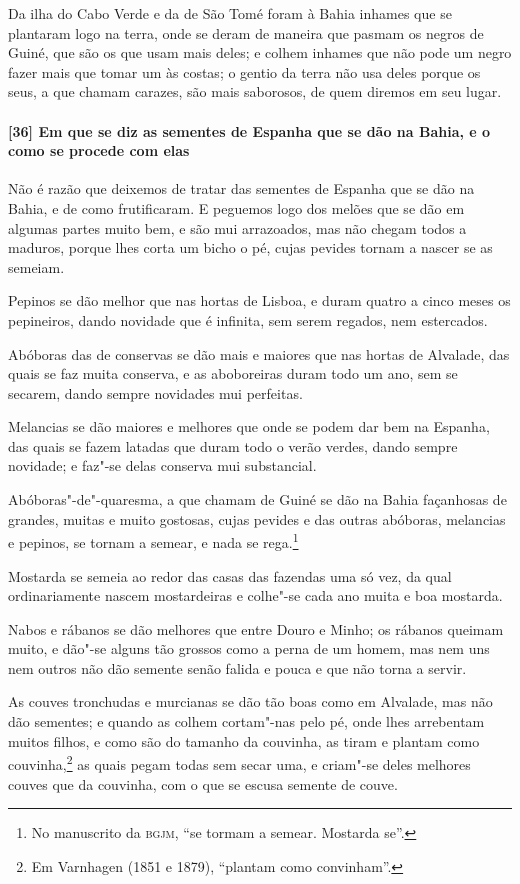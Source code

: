 \begin{linenumbers}
Da ilha do Cabo Verde e da de São Tomé foram à Bahia inhames que se plantaram logo na
terra, onde se deram de maneira que pasmam os negros de Guiné, que são os que usam mais
deles; e colhem inhames que não pode um negro fazer mais que tomar um às costas; o gentio
da terra não usa deles porque os seus, a que chamam carazes, são mais saborosos, de quem
diremos em seu lugar.

\paragraph{[36] Em que se diz as sementes de Espanha que se dão na Bahia, e o como se
procede com elas}\quad
Não é razão que deixemos de tratar das sementes de Espanha que se dão na Bahia, e de como
frutificaram. E peguemos logo dos melões que se dão em algumas partes muito bem, e são mui
arrazoados, mas não chegam todos a maduros, porque lhes corta um bicho o pé, cujas pevides
tornam a nascer se as semeiam.

Pepinos se dão melhor que nas hortas de Lisboa, e duram quatro a cinco meses os
pepineiros, dando novidade que é infinita, sem serem regados, nem estercados.

Abóboras das de conservas se dão mais e maiores que nas hortas de Alvalade, das quais se
faz muita conserva, e as aboboreiras duram todo um ano, sem se secarem, dando sempre
novidades mui perfeitas.

Melancias se dão maiores e melhores que onde se podem dar bem na Espanha, das quais se
fazem latadas que duram todo o verão verdes, dando sempre novidade; e faz"-se delas
conserva mui substancial.

Abóboras"-de"-quaresma, a que chamam de Guiné se dão na Bahia façanhosas de grandes, muitas
e muito gostosas, cujas pevides e das outras abóboras, melancias e pepinos, se tornam a
semear, e nada se rega.\footnote{ No manuscrito da \textsc{bgjm}, ``se tormam a semear.
Mostarda se''.}

Mostarda se semeia ao redor das casas das fazendas uma só vez, da qual ordinariamente
nascem mostardeiras e colhe"-se cada ano muita e boa mostarda.

Nabos e rábanos se dão melhores que entre Douro e Minho; os rábanos queimam muito, e
dão"-se alguns tão grossos como a perna de um homem, mas nem uns nem outros não dão semente
senão falida e pouca e que não torna a servir.

As couves tronchudas e murcianas se dão tão boas como em Alvalade, mas não dão sementes; e
quando as colhem cortam"-nas pelo pé, onde lhes arrebentam muitos filhos, e como são do
tamanho da couvinha, as tiram e plantam como couvinha,\footnote{ Em Varnhagen (1851 e
1879), ``plantam como convinham''.} as quais pegam todas sem secar uma, e criam"-se deles
melhores couves que da couvinha, com o que se escusa semente de couve.


\end{linenumbers}
